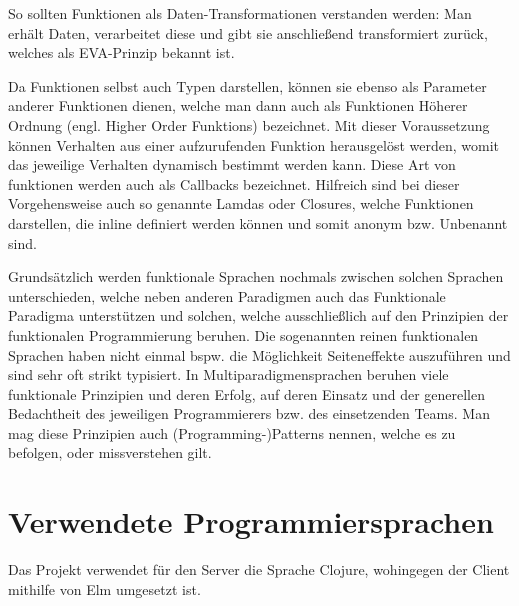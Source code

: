So sollten Funktionen als Daten-Transformationen verstanden werden: Man erhält Daten, verarbeitet diese und gibt sie anschließend transformiert zurück, welches als \ac{EVA}-Prinzip bekannt ist.
\par
Da Funktionen selbst auch Typen darstellen, können sie ebenso als Parameter anderer Funktionen dienen, welche man dann auch als Funktionen Höherer Ordnung (engl. Higher Order Funktions) bezeichnet.
Mit dieser Voraussetzung können Verhalten aus einer aufzurufenden Funktion herausgelöst werden, womit das jeweilige Verhalten dynamisch bestimmt werden kann.
Diese Art von funktionen werden auch als Callbacks bezeichnet.
Hilfreich sind bei dieser Vorgehensweise auch so genannte Lamdas oder Closures, welche Funktionen darstellen, die inline definiert werden können und somit anonym \ac{bzw.} Unbenannt sind.
\par
Grundsätzlich werden funktionale Sprachen nochmals zwischen solchen Sprachen unterschieden, welche neben anderen Paradigmen auch das Funktionale Paradigma unterstützen und solchen, welche ausschließlich auf den Prinzipien der funktionalen Programmierung beruhen.
Die sogenannten reinen funktionalen Sprachen haben nicht einmal \ac{bspw.} die Möglichkeit Seiteneffekte auszuführen und sind sehr oft strikt typisiert.
In Multiparadigmensprachen beruhen viele funktionale Prinzipien und deren Erfolg, auf deren Einsatz und der generellen Bedachtheit des jeweiligen Programmierers \ac{bzw.} des einsetzenden Teams.
Man mag diese Prinzipien auch (Programming-)Patterns nennen, welche es zu befolgen, oder missverstehen gilt.

\section{Verwendete Programmiersprachen}
Das Projekt verwendet für den Server die Sprache Clojure, wohingegen der Client mithilfe von Elm umgesetzt ist.

